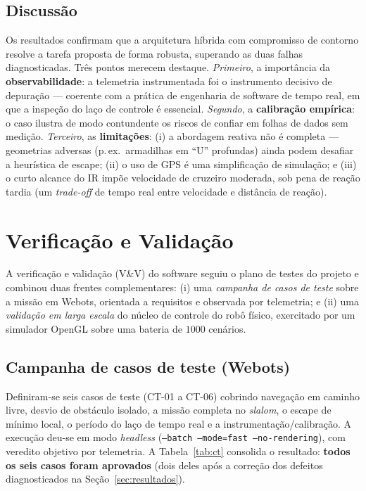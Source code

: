 \documentclass[11pt,a4paper]{article}
\begin{document}
\subsection{Discussão}
Os resultados confirmam que a arquitetura híbrida com compromisso de contorno resolve a tarefa proposta de forma robusta, superando as duas falhas diagnosticadas. Três pontos merecem destaque. \emph{Primeiro}, a importância da \textbf{observabilidade}: a telemetria instrumentada foi o instrumento decisivo de depuração --- coerente com a prática de engenharia de software de tempo real, em que a inspeção do laço de controle é essencial. \emph{Segundo}, a \textbf{calibração empírica}: o caso ilustra de modo contundente os riscos de confiar em folhas de dados sem medição. \emph{Terceiro}, as \textbf{limitações}: (i) a abordagem reativa não é completa --- geometrias adversas (p.\,ex.\ armadilhas em ``U'' profundas) ainda podem desafiar a heurística de escape; (ii) o uso de GPS é uma simplificação de simulação; e (iii) o curto alcance do IR impõe velocidade de cruzeiro moderada, sob pena de reação tardia (um \emph{trade-off} de tempo real entre velocidade e distância de reação).

\section{Verificação e Validação}\label{sec:vv}
A verificação e validação (V\&V) do software seguiu o plano de testes do projeto e combinou duas frentes complementares: (i) uma \emph{campanha de casos de teste} sobre a missão em Webots, orientada a requisitos e observada por telemetria; e (ii) uma \emph{validação em larga escala} do núcleo de controle do robô físico, exercitado por um simulador OpenGL sobre uma bateria de $1000$ cenários.

\subsection{Campanha de casos de teste (Webots)}
Definiram-se seis casos de teste (CT-01 a CT-06) cobrindo navegação em caminho livre, desvio de obstáculo isolado, a missão completa no \emph{slalom}, o escape de mínimo local, o período do laço de tempo real e a instrumentação/calibração. A execução deu-se em modo \emph{headless} (\texttt{--batch --mode=fast --no-rendering}), com veredito objetivo por telemetria. A Tabela~\ref{tab:ct} consolida o resultado: \textbf{todos os seis casos foram aprovados} (dois deles após a correção dos defeitos diagnosticados na Seção~\ref{sec:resultados}).
\end{document}
